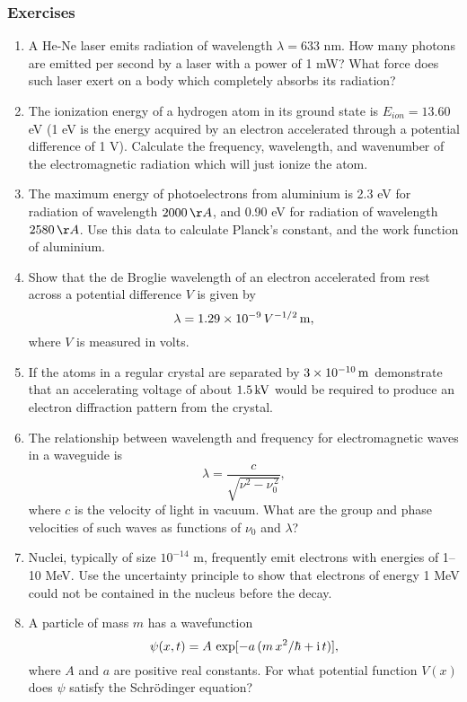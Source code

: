 \subsubsection*{Exercises}
{\small
\begin{enumerate}
\item A He-Ne laser emits radiation of wavelength $\lambda = 633$ nm. How
many photons are emitted per second by a laser with a power of 1 mW?
What force does such laser exert on a body which completely absorbs its
radiation? 

\item The ionization energy of a hydrogen atom in its ground state is
$E_{ion} = 13.60$ eV (1 eV is the energy acquired by an electron accelerated through a potential difference of 1 V). Calculate the frequency, wavelength,
and wavenumber of the electromagnetic radiation which will just ionize
the atom. 

\item The maximum energy of photoelectrons from aluminium is 2.3 eV
for radiation of wavelength $2000\,\AA$, and 0.90 eV for radiation of
wavelength $2580\,\AA$. Use this data to calculate Planck's constant,
and the work function of aluminium. 

\item Show that the de Broglie wavelength of an electron accelerated from rest across a potential difference $V$
is given by
$$
\lambda = 1.29\times 10^{-9}\,V^{-1/2}\,{\rm m},
$$
where $V$ is measured in volts.

\item If the atoms in a regular crystal are separated by $3\times 10^{-10}\,{\rm m}$ demonstrate that an accelerating
voltage of about $1.5\,{\rm kV}$  would be required to produce an electron diffraction pattern from the crystal. 

\item The relationship between wavelength and frequency for electromagnetic waves in a waveguide is
$$
\lambda = \frac{c}{\sqrt{\nu^2 - \nu_0^{\,2}}},
$$
where $c$ is the velocity of light in vacuum. 
What are  the group and phase velocities of such waves as functions of $\nu_0$ and $\lambda$? 

\item Nuclei, typically of size $10^{-14}$ m, frequently emit electrons
with energies of 1--10 MeV. Use the uncertainty principle to show
that electrons of energy 1 MeV could not be contained in the nucleus
before the decay. 

\item A particle of mass $m$ has a wavefunction
$$
\psi(x,t) = A\,\exp[-a\,(m\,x^2/\hbar + {\rm i}\, t)],
$$
where $A$ and $a$ are positive real constants. For what potential
function $V(x)$ does $\psi$ satisfy the Schr\"{o}dinger equation?

\end{enumerate} 
}